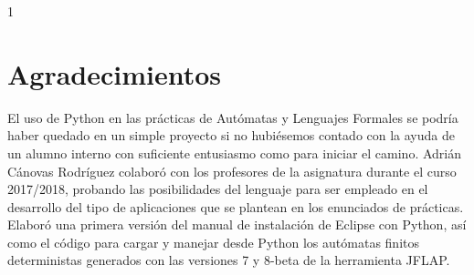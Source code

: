 \documentclass[a4paper,12pt]{book}
\begin{document}
\clearpage

\pagestyle{empty}

\null \vfill

\clearpage{\pagestyle{empty}\cleardoublepage}

\setcounter{page}1
\setcounter{secnumdepth}{4}	%
\setcounter{tocdepth}{2}	%


\pagestyle{fancy}
\renewcommand{\chaptername}{}
\renewcommand{\chaptermark}[1]{\lhead[{\sc{\chaptername\ \thechapter.\ #1}}]{}}
\renewcommand{\sectionmark}[1]{\rhead[ ]{{\thesection.\ #1}}}
\renewcommand{\headrulewidth}{0.5pt}
\renewcommand{\footrulewidth}{0.5pt}
\setlength{\headheight}{14pt}


\setlength{\parindent}{15pt}
\setlength{\itemindent}{15pt}


\clearpage{\pagestyle{empty}\cleardoublepage}

\pagestyle{plain}

\section*{Agradecimientos}

El uso de Python en las prácticas de Autómatas y Lenguajes Formales se podría haber quedado en un simple proyecto si no hubiésemos contado con la ayuda de un alumno interno con suficiente entusiasmo como para iniciar el camino. Adrián Cánovas Rodríguez colaboró con los profesores de la asignatura durante el curso 2017/2018, probando las posibilidades del lenguaje para ser empleado en el desarrollo del tipo de aplicaciones que se plantean en los enunciados de prácticas. Elaboró una primera versión del manual de instalación de Eclipse con Python, así como el código para cargar y manejar desde Python los autómatas finitos deterministas generados con las versiones 7 y 8-beta de la herramienta JFLAP.
\end{document}
